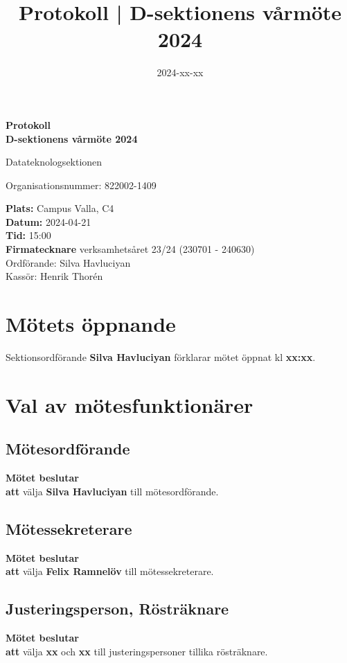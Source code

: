 \documentclass{datateknologsektionen-document}
\title{Protokoll | D-sektionens vårmöte 2024}
\date{2024-xx-xx}
\newcommand{\ind}{\hspace*{2em}}
\newcommand{\motetbeslutar}{\textbf{Mötet beslutar}}
\newcommand{\att}{\\\ind\textbf{att}}
\begin{document}
\hspace{0pt}
\vfill
\begin{center}
	\Huge\textbf{Protokoll \\ D-sektionens vårmöte 2024}

	\huge Datateknologsektionen

	\large
	Organisationsnummer: 822002-1409

\end{center}
\vfill
{\large
	\textbf{Plats:} Campus Valla, C4 \\
	\textbf{Datum:} 2024-04-21 \\
	\textbf{Tid:} 15:00 \\
	\textbf{Firmatecknare} verksamhetsåret 23/24 (230701 - 240630) \\
	\ind Ordförande: Silva Havluciyan \\
	\ind Kassör: Henrik Thorén
}
\vfill
\hspace{0pt}
\pagebreak




\tableofcontents
\pagebreak





\section{Mötets öppnande}
Sektionsordförande \textbf{Silva Havluciyan} förklarar mötet öppnat kl \textbf{xx:xx}.




\section{Val av mötesfunktionärer}
\subsection{Mötesordförande}
\motetbeslutar\att{} välja \textbf{Silva Havluciyan} till mötesordförande.

\subsection{Mötessekreterare}
\motetbeslutar\att{} välja \textbf{Felix Ramnelöv} till mötessekreterare.

\subsection{Justeringsperson, Rösträknare}
\motetbeslutar\att{} välja \textbf{xx} och \textbf{xx} till justeringspersoner tillika rösträknare.
\end{document}
